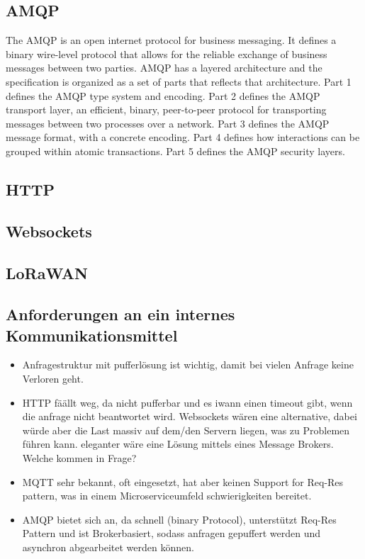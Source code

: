\subsection{AMQP}

\begin{definition}
    The \ac{AMQP} is an open internet protocol for business messaging. It defines a binary wire-level protocol that allows for the reliable exchange of business messages between two parties. AMQP has a layered architecture and the specification is organized as a set of parts that reflects that architecture. Part 1 defines the AMQP type system and encoding. Part 2 defines the AMQP transport layer, an efficient, binary, peer-to-peer protocol for transporting messages between two processes over a network. Part 3 defines the AMQP message format, with a concrete encoding. Part 4 defines how interactions can be grouped within atomic transactions. Part 5 defines the AMQP security layers.
\end{definition}
\subsection{HTTP}
\subsection{Websockets}
\subsection{LoRaWAN}
\subsection{Anforderungen an ein internes Kommunikationsmittel}

\begin{itemize}
    \item Anfragestruktur mit pufferlösung ist wichtig, damit bei vielen Anfrage keine Verloren geht.
    \item HTTP fäällt weg, da nicht pufferbar und es iwann einen timeout gibt, wenn die anfrage nicht beantwortet wird. Websockets wären eine alternative, dabei würde aber die Last massiv auf dem/den Servern liegen, was zu Problemen führen kann. eleganter wäre eine Lösung mittels eines Message Brokers. Welche kommen in Frage?
    \item MQTT sehr bekannt, oft eingesetzt, hat aber keinen Support for Req-Res pattern, was in einem Microserviceumfeld schwierigkeiten bereitet.
    \item AMQP bietet sich an, da schnell (binary Protocol), unterstützt Req-Res Pattern und ist Brokerbasiert, sodass anfragen gepuffert werden und asynchron abgearbeitet werden können.
\end{itemize}

